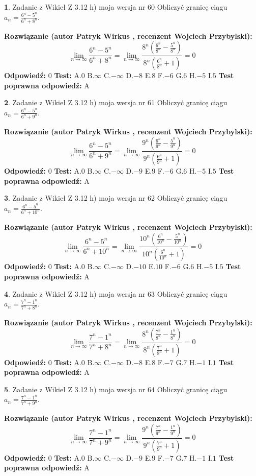 \documentclass[12pt, a4paper]{article}
\theoremstyle{definition} %
\newtheorem{zad}{}
\newcommand{\zadStart}[1]{\begin{zad}#1\newline}
\newcommand{\zadStop}{\end{zad}}
\newcommand{\rozwStart}[2]{\noindent \textbf{Rozwiązanie (autor #1 , recenzent #2): }\newline}
\newcommand{\rozwStop}{\newline}
\newcommand{\odpStart}{\noindent \textbf{Odpowiedź:}\newline}
\newcommand{\odpStop}{\newline}
\newcommand{\testStart}{\noindent \textbf{Test:}\newline}
\newcommand{\testStop}{\newline}
\newcommand{\kluczStart}{\noindent \textbf{Test poprawna odpowiedź:}\newline}
\newcommand{\kluczStop}{\newline}
\begin{document}
\zadStart{Zadanie z Wikieł Z 3.12 h) moja wersja nr 60}
Obliczyć granicę ciągu $a_{n}=\frac{6^{n} - 5^{n}}{6^{n} + 8^{n}}$.
\zadStop
\rozwStart{Patryk Wirkus}{Wojciech Przybylski}
$$\lim\limits_{n\to\infty}\frac{6^{n} - 5^{n}}{6^{n} + 8^{n}} = \lim\limits_{n\to\infty}\frac{8^{n}(\frac{6^{n}}{8^{n}} - \frac{5^{n}}{8^{n}})}{8^{n}(\frac{6^{n}}{8^{n}} + 1)} = 0$$
\rozwStop
\odpStart
$0$
\odpStop
\testStart
A.$0$
B.$\infty$
C.$-\infty$
D.$-8$
E.$8$
F.$-6$
G.$6$
H.$-5$
I.$5$
\testStop
\kluczStart
A
\kluczStop



\zadStart{Zadanie z Wikieł Z 3.12 h) moja wersja nr 61}
Obliczyć granicę ciągu $a_{n}=\frac{6^{n} - 5^{n}}{6^{n} + 9^{n}}$.
\zadStop
\rozwStart{Patryk Wirkus}{Wojciech Przybylski}
$$\lim\limits_{n\to\infty}\frac{6^{n} - 5^{n}}{6^{n} + 9^{n}} = \lim\limits_{n\to\infty}\frac{9^{n}(\frac{6^{n}}{9^{n}} - \frac{5^{n}}{9^{n}})}{9^{n}(\frac{6^{n}}{9^{n}} + 1)} = 0$$
\rozwStop
\odpStart
$0$
\odpStop
\testStart
A.$0$
B.$\infty$
C.$-\infty$
D.$-9$
E.$9$
F.$-6$
G.$6$
H.$-5$
I.$5$
\testStop
\kluczStart
A
\kluczStop



\zadStart{Zadanie z Wikieł Z 3.12 h) moja wersja nr 62}
Obliczyć granicę ciągu $a_{n}=\frac{6^{n} - 5^{n}}{6^{n} + 10^{n}}$.
\zadStop
\rozwStart{Patryk Wirkus}{Wojciech Przybylski}
$$\lim\limits_{n\to\infty}\frac{6^{n} - 5^{n}}{6^{n} + 10^{n}} = \lim\limits_{n\to\infty}\frac{10^{n}(\frac{6^{n}}{10^{n}} - \frac{5^{n}}{10^{n}})}{10^{n}(\frac{6^{n}}{10^{n}} + 1)} = 0$$
\rozwStop
\odpStart
$0$
\odpStop
\testStart
A.$0$
B.$\infty$
C.$-\infty$
D.$-10$
E.$10$
F.$-6$
G.$6$
H.$-5$
I.$5$
\testStop
\kluczStart
A
\kluczStop



\zadStart{Zadanie z Wikieł Z 3.12 h) moja wersja nr 63}
Obliczyć granicę ciągu $a_{n}=\frac{7^{n} - 1^{n}}{7^{n} + 8^{n}}$.
\zadStop
\rozwStart{Patryk Wirkus}{Wojciech Przybylski}
$$\lim\limits_{n\to\infty}\frac{7^{n} - 1^{n}}{7^{n} + 8^{n}} = \lim\limits_{n\to\infty}\frac{8^{n}(\frac{7^{n}}{8^{n}} - \frac{1^{n}}{8^{n}})}{8^{n}(\frac{7^{n}}{8^{n}} + 1)} = 0$$
\rozwStop
\odpStart
$0$
\odpStop
\testStart
A.$0$
B.$\infty$
C.$-\infty$
D.$-8$
E.$8$
F.$-7$
G.$7$
H.$-1$
I.$1$
\testStop
\kluczStart
A
\kluczStop



\zadStart{Zadanie z Wikieł Z 3.12 h) moja wersja nr 64}
Obliczyć granicę ciągu $a_{n}=\frac{7^{n} - 1^{n}}{7^{n} + 9^{n}}$.
\zadStop
\rozwStart{Patryk Wirkus}{Wojciech Przybylski}
$$\lim\limits_{n\to\infty}\frac{7^{n} - 1^{n}}{7^{n} + 9^{n}} = \lim\limits_{n\to\infty}\frac{9^{n}(\frac{7^{n}}{9^{n}} - \frac{1^{n}}{9^{n}})}{9^{n}(\frac{7^{n}}{9^{n}} + 1)} = 0$$
\rozwStop
\odpStart
$0$
\odpStop
\testStart
A.$0$
B.$\infty$
C.$-\infty$
D.$-9$
E.$9$
F.$-7$
G.$7$
H.$-1$
I.$1$
\testStop
\kluczStart
A
\kluczStop
\end{document}
